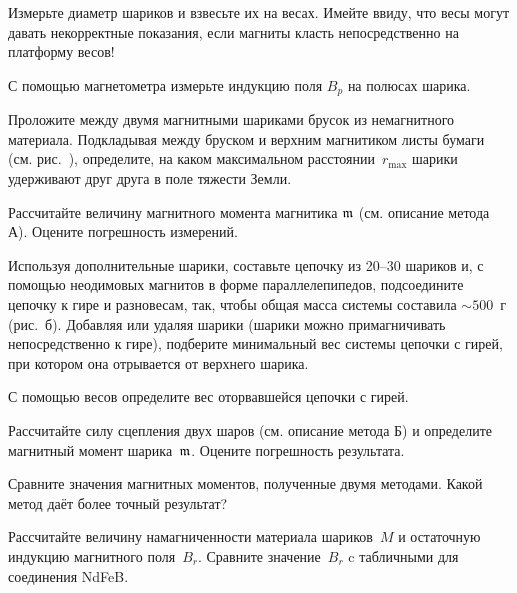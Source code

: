 \begin{lab:task}

\taskpreamble{~}
\vspace*{-8ex} %


\item Измерьте диаметр шариков и взвесьте их на весах. Имейте ввиду, что весы могут давать
некорректные показания, если магниты класть непосредственно на платформу весов!

\item С помощью магнетометра измерьте индукцию поля $B_p$ на полюсах шарика. 
 
\item Проложите между двумя магнитными шариками брусок из немагнитного
материала. Подкладывая между бруском и верхним магнитиком листы бумаги 
(см. рис.~), определите, на каком максимальном 
расстоянии~$r_{\mathrm{max}}$ шарики удерживают друг друга в поле тяжести Земли. 

\item Рассчитайте величину магнитного момента магнитика $\mathfrak{m}$
(см. описание метода А). Оцените погрешность измерений.

\item Используя дополнительные шарики, составьте цепочку из 20--30 шариков и, 
с помощью неодимовых магнитов в форме параллелепипедов, подсоедините цепочку к
гире и разновесам, так, чтобы общая масса системы составила $\sim500$~г 
(рис.~б). 
Добавляя или удаляя шарики (шарики можно примагничивать непосредственно к
гире), подберите минимальный вес системы цепочки с гирей, 
при котором она отрывается от верхнего шарика. 

\item С помощью весов определите вес оторвавшейся цепочки с гирей.

\item Рассчитайте силу сцепления двух шаров (см. описание метода Б) 
и определите магнитный момент шарика~$\mathfrak{m}$. Оцените погрешность результата.

\item Сравните значения магнитных моментов, полученные двумя методами. 
Какой метод даёт более точный результат?

\item Рассчитайте величину намагниченности материала шариков~$M$
и остаточную индукцию магнитного поля~$B_r$. 
Сравните значение~$B_r$ c табличными для соединения NdFeB.


\end{lab:task}
